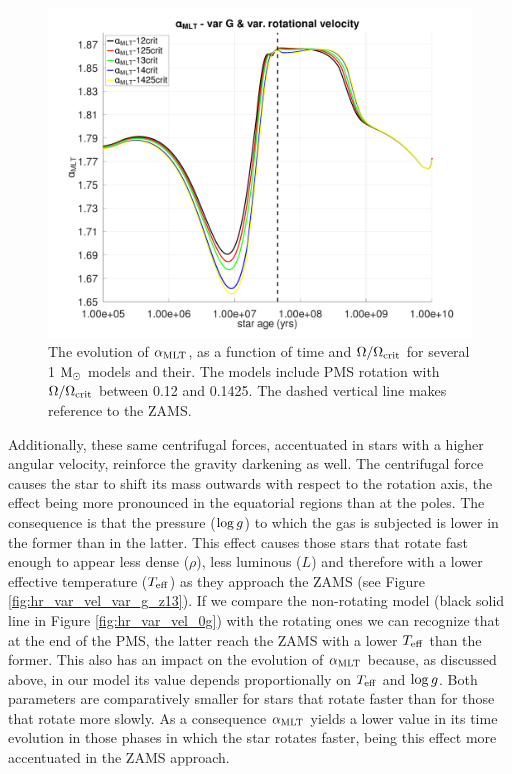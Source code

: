 \documentclass[fleqn,usenatbib]{mnras}
\begin{document}
\begin{figure}
	\includegraphics[clip,width=\columnwidth]{figures/paper2/alpha_mlt_var_vel_g3.pdf}
    \caption{The evolution of $\alpha_{\mathrm{MLT}}$, as a function of time and $\Omega / \Omega_{\mathrm{crit}}$ for several 1 $\mathrm{M}_\odot$ models and their. The models include PMS rotation with $\Omega / \Omega_{\mathrm{crit}}$ between 0.12 and 0.1425. The dashed vertical line makes reference to the ZAMS.}
    \label{fig:alpha_mlt_var_vel_g3}
\end{figure}

Additionally, these same centrifugal forces, accentuated in stars with a higher angular velocity, reinforce the gravity darkening \citep[see e.g. ][]{Gossage2021,Paxton2019,Eggenberger2012} as well. The centrifugal force causes the star to shift its mass outwards with respect to the rotation axis, the effect being more pronounced in the equatorial regions than at the poles. The consequence is that the pressure ($\mathrm{log} \, g$) to which the gas is subjected is lower in the former than in the latter. This effect causes those stars that rotate fast enough to appear less dense ($\rho$), less luminous ($L$) and therefore with a lower effective temperature ($T_{\mathrm{eff}}$) as they approach the ZAMS (see Figure \ref{fig:hr_var_vel_var_g_z13}). If we compare the non-rotating model (black solid line in Figure \ref{fig:hr_var_vel_0g}) with the rotating ones we can recognize that at the end of the PMS, the latter reach the ZAMS with a lower $T_{\mathrm{eff}}$ than the former. This also has an impact on the evolution of $\alpha_{\mathrm{MLT}}$ because, as discussed above, in our model its value depends proportionally on $T_{\mathrm{eff}}$ and $\mathrm{log} \, g$. Both parameters are comparatively smaller for stars that rotate faster than for those that rotate more slowly. As a consequence $\alpha_{\mathrm{MLT}}$ yields a lower value in its time evolution in those phases in which the star rotates faster, being this effect more accentuated in the ZAMS approach.\par
\end{document}
